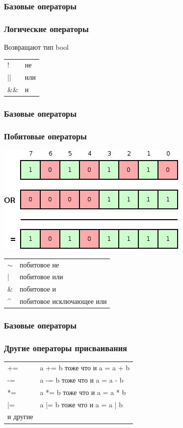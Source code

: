 \documentclass[14pt,pdf,hyperref={unicode}]{beamer}
\begin{document}
\begin{frame}
\frametitle{Базовые операторы}
\frametitle{Логические операторы}
Возвращают тип bool
\begin{center}
\begin{tabular}{ l l}
  ! & не \\
  || & или \\
  \&\& & и \\
\end{tabular}
\end{center}
\end{frame}

\begin{frame}
\frametitle{Базовые операторы}
\frametitle{Побитовые операторы}
\begin{center}
\includegraphics[scale=0.5]{bitwise_or.png}
\end{center}
\begin{center}
\begin{tabular}{ l l}
  $\sim$ & побитовое не \\
  | & побитовое или \\
  \& & побитовое и \\
  \^{} & побитовое исключающее или \\
\end{tabular}
\end{center}
\end{frame}

\begin{frame}
\frametitle{Базовые операторы}
\frametitle{Другие операторы присваивания}
\begin{center}
\begin{tabular}{ l l}
  += & a += b тоже что и a = a + b  \\
  -= & a -= b тоже что и a = a - b  \\
  *= & a *= b тоже что и a = a * b  \\
  |= & a |= b тоже что и a = a | b  \\
  и другие
\end{tabular}
\end{center}
\end{frame}
\end{document}
